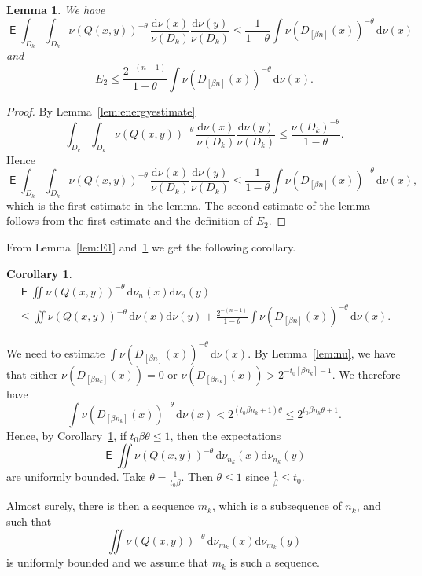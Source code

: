 \documentclass[11pt]{article}
\newtheorem{lemm}[theo]{Lemma}
\newtheorem{coro}[theo]{Corollary}
\theoremstyle{definition}
\numberwithin{equation}{section}
\numberwithin{figure}{section}
\numberwithin{table}{section}
\DeclareMathOperator{\E}{\mathsf{E}}
\newcommand*{\dd}{\mathrm{d}}
\begin{document}
\begin{lemm}\label{lem:E2}
We have
\[
\E \int_{D_k} \int_{D_k} \nu(Q(x,y))^{-\theta} \, \frac{\dd
\nu (x)}{\nu (D_k)} \frac{\dd \nu (y)}{\nu (D_k)} \leq
\frac{1}{1-\theta} \int \nu (D_{[\beta n]} (x))^{-\theta} \,
\dd \nu (x)
\]
and
\[
E_2 \leq \frac{2^{-(n-1)}}{1-\theta} \int \nu (D_{[\beta n]} (x))^{-\theta} \, \dd \nu (x).
\]
\end{lemm}

\begin{proof}
By Lemma~\ref{lem:energyestimate}
\[
\int_{D_k} \int_{D_k} \nu(Q(x,y))^{-\theta} \, \frac{\dd \nu (x)}{\nu (D_k)} \frac{\dd \nu (y)}{\nu (D_k)} \leq
\frac{\nu (D_k)^{-\theta}}{1-\theta}.
\]
Hence
\[
\E \int_{D_k} \int_{D_k} \nu(Q(x,y))^{-\theta} \, \frac{\dd
\nu (x)}{\nu (D_k)} \frac{\dd \nu (y)}{\nu (D_k)} \leq
\frac{1}{1-\theta} \int \nu (D_{[\beta n]} (x))^{-\theta} \,
\dd \nu (x),
\]
which is the first estimate in the lemma. The second estimate of the lemma follows from the first estimate and the definition of $E_2$.
\end{proof}

From Lemma~\ref{lem:E1} and~\ref{lem:E2} we get the following corollary.

\begin{coro}\label{cor:expectation}
\begin{multline*}
\E \iint \nu (Q(x,y))^{-\theta} \, \dd \nu_n (x) \dd
\nu_n (y) \\ \leq \iint \nu (Q(x,y))^{-\theta} \, \dd \nu (x) \dd \nu (y) + \frac{2^{-(n-1)}}{1-\theta} \int \nu (D_{[\beta n]} (x))^{-\theta} \, \dd \nu (x).
\end{multline*}
\end{coro}

We need to estimate $\int \nu (D_{[\beta n]} (x))^{-\theta} \,
\dd \nu(x)$. By Lemma~\ref{lem:nu}, we have that either $\nu (D_{[\beta n_k]} (x)) = 0$ or $\nu (D_{[\beta n_k]} (x)) > 2^{-t_0 [\beta n_k] - 1}$. We therefore have
\[
\int \nu (D_{[\beta n_k]} (x))^{-\theta} \, \dd \nu(x) < 2^{(t_0 \beta n_k + 1) \theta} \leq 2^{t_0 \beta n_k \theta + 1}.
\]
Hence, by Corollary~\ref{cor:expectation}, if $t_0 \beta \theta \leq 1$, then the expectations
\[
\E \iint \nu (Q(x,y))^{-\theta} \, \dd \nu_{n_k} (x) \dd
\nu_{n_k} (y)
\]
are uniformly bounded. Take $\theta = \frac{1}{t_0 \beta}$. Then $\theta \leq 1$ since $\frac{1}{\beta} \leq t_0$.

Almost surely, there is then a sequence $m_k$, which is a subsequence of $n_k$, and such that
\[
\iint \nu (Q(x,y))^{-\theta} \, \dd \nu_{m_k} (x) \dd
\nu_{m_k} (y)
\]
is uniformly bounded and we assume that $m_k$ is such a sequence.
\end{document}
